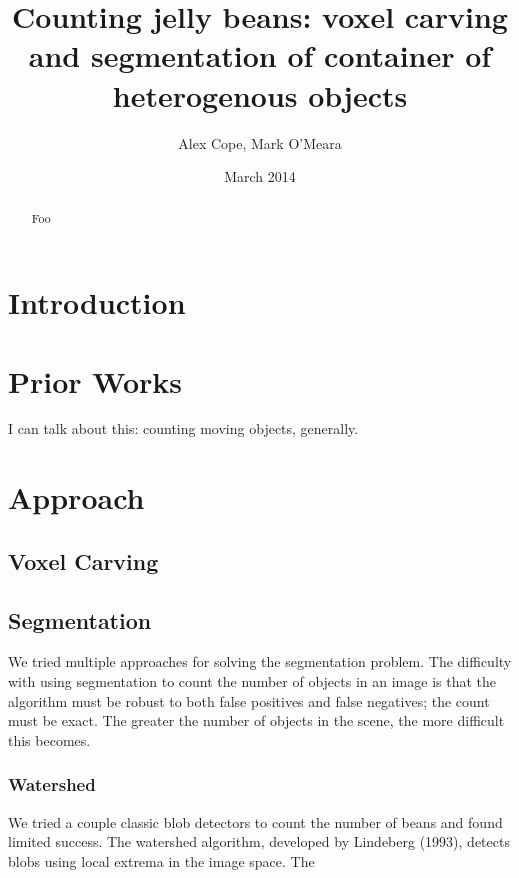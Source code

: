 \documentclass[12pt]{article}
\begin{document}
\title{Counting jelly beans: voxel carving and segmentation of container of heterogenous objects}
\author{Alex Cope, Mark O'Meara}
\date{March 2014}
\maketitle

\begin{abstract}

Foo

\end{abstract}

\section{Introduction}

\section{Prior Works}

I can talk about this: counting moving objects, generally.

\section{Approach}

\subsection{Voxel Carving}

\subsection{Segmentation}

We tried multiple approaches for solving the segmentation problem. The difficulty with using segmentation to count the number of objects in an image is that the algorithm must be robust to both false positives and false negatives; the count must be exact. The greater the number of objects in the scene, the more difficult this becomes. 

\subsubsection{Watershed}

We tried a couple classic blob detectors to count the number of beans and found limited success. The watershed algorithm, developed by Lindeberg (1993), detects blobs using local extrema in the image space. The
\end{document}
